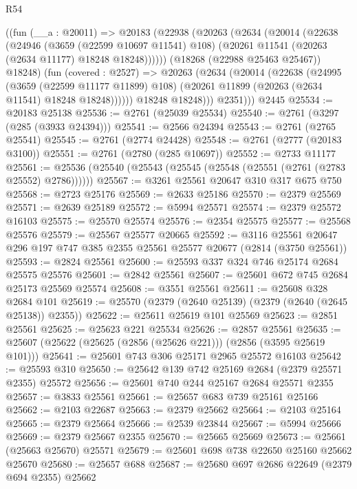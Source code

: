 \begin{lexlean}{R54}
\begin{coremodule}
        ((fun (__a : @20011) =>
        @20183
          (@22938
            (@20263
              (@2634
                (@20014
                  (@22638
                    (@24946
                      (@3659 (@22599 @10697 @11541) @108)
                      (@20261 @11541 (@20263 (@2634 @11177) @18248 @18248))))))
              (@18268 (@22988 @25463 @25467))
              @18248)
            (fun (covered : @2527) =>
            @20263
              (@2634
                (@20014
                  (@22638
                    (@24995
                      (@3659 (@22599 @11177 @11899) @108)
                      (@20261 @11899 (@20263 (@2634 @11541) @18248 @18248))))))
              @18248
              @18248)))
          @2351)))
    @2445
@25534 := @20183 @25138
@25536 := @2761 (@25039 @25534)
@25540 := @2761 (@3297 (@285 (@3933 @24394)))
@25541 := @2566 @24394
@25543 := @2761 (@2765 @25541)
@25545 := @2761 (@2774 @24428)
@25548 := @2761 (@2777 (@20183 @3100))
@25551 := @2761 (@2780 (@285 @10697))
@25552 := @2733 @11177
@25561 := @25536 (@25540 (@25543 (@25545 (@25548 (@25551 (@2761 (@2783 @25552) @2786))))))
@25567 := @3261 @25561 @20647 @310 @317 @675 @750
@25568 := @2723 @25176
@25569 := @2633 @25186
@25570 := @2379 @25569
@25571 := @2639 @25189
@25572 := @5994 @25571
@25574 := @2379 @25572 @16103
@25575 := @25570 @25574
@25576 := @2354 @25575
@25577 := @25568 @25576
@25579 := @25567 @25577 @20665
@25592 := @3116 @25561 @20647 @296 @197 @747 @385 @2355 @25561 @25577 @20677 (@2814 (@3750 @25561))
@25593 := @2824 @25561
@25600 := @25593 @337 @324 @746 @25174 @2684 @25575 @25576
@25601 := @2842 @25561
@25607 := @25601 @672 @745 @2684 @25173 @25569 @25574
@25608 := @3551 @25561
@25611 := @25608 @328 @2684 @101
@25619 := @25570 (@2379 (@2640 @25139) (@2379 (@2640 (@2645 @25138)) @2355))
@25622 := @25611 @25619 @101 @25569
@25623 := @2851 @25561
@25625 := @25623 @221 @25534
@25626 := @2857 @25561
@25635 := @25607 (@25622 (@25625 (@2856 (@25626 @221))) (@2856 (@3595 @25619 @101)))
@25641 := @25601 @743 @306 @25171 @2965 @25572 @16103
@25642 := @25593 @310
@25650 := @25642 @139 @742 @25169 @2684 (@2379 @25571 @2355) @25572
@25656 := @25601 @740 @244 @25167 @2684 @25571 @2355
@25657 := @3833 @25561
@25661 := @25657 @683 @739 @25161 @25166
@25662 := @2103 @22687
@25663 := @2379 @25662
@25664 := @2103 @25164
@25665 := @2379 @25664
@25666 := @2539 @23844
@25667 := @5994 @25666
@25669 := @2379 @25667 @2355
@25670 := @25665 @25669
@25673 := @25661 (@25663 @25670) @25571
@25679 := @25601 @698 @738 @22650 @25160 @25662 @25670
@25680 := @25657 @688
@25687 := @25680 @697 @2686 @22649 (@2379 @694 @2355) @25662

\end{coremodule}
\end{lexlean}
